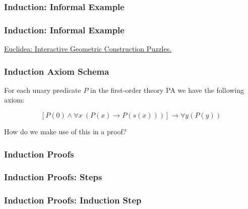 \documentclass{beamer}
\theoremstyle{indentDefn} \newtheorem{defn}[]{Definition}
\begin{document}
\begin{frame}
	\frametitle{Induction: Informal Example}
\end{frame}

\begin{frame}
	\frametitle{Induction: Informal Example}


	\vspace{75mm}
	\href{https://www.euclidea.xyz/}{Euclidea: Interactive Geometric Construction Puzzles.}
\end{frame}

\begin{frame}
	\frametitle{Induction Axiom Schema}

	For each unary predicate $P$ in the first-order theory PA we have the following axiom: 

	$$[P(0) \land \forall x \ (P(x) \to P(s(x)))] \rightarrow \forall y (P(y))$$

	How do we make use of this in a proof? 

	\vspace{4cm}

\end{frame}

\begin{frame}
	\frametitle{Induction Proofs}


\end{frame}

\begin{frame}
	\frametitle{Induction Proofs: Steps}


\end{frame}

\begin{frame}
	\frametitle{Induction Proofs: Induction Step}



\end{frame}
\end{document}
